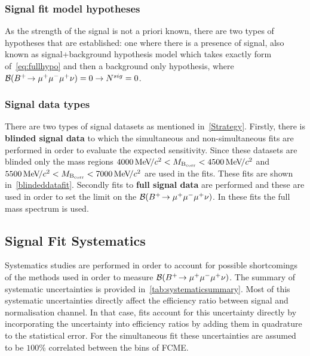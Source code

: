\subsubsection{Signal fit model hypotheses}
As the strength of the signal is not a priori known, there are two types of hypotheses that are established: one where there is a presence of signal, also known as signal+background hypothesis model which takes exactly form of~\autoref{eq:fullhypo} and then a background only hypothesis, where $\mathcal{B}({{{B}^+}}\!\rightarrow {\ensuremath{\mu^+\mu^-\mu^+}}\nu)=0 \rightarrow N^{sig}=0$.

\subsubsection{Signal data types}

There are two types of signal datasets as mentioned in~\autoref{Strategy}. Firstly, there is \textbf{blinded signal data} to which the simultaneous and non-simultaneous fits are performed in order to evaluate the expected sensitivity. Since these datasets are blinded only the mass regions $4000{{\mathrm{\,Me\kern -0.1em V\!/}c^2}}<M_{\rm{B_{corr}}}<{4500{\mathrm{\,Me\kern -0.1em V\!/}c^2}}$ and $5500{{\mathrm{\,Me\kern -0.1em V\!/}c^2}}<M_{\rm{B_{corr}}}<{7000{\mathrm{\,Me\kern -0.1em V\!/}c^2}}$ are used in the fits. These fits are shown in~\autoref{blindeddatafit}. Secondly fits to \textbf{full signal data} are performed and these are used in order to set the limit on the $\mathcal{B}({{{B}^+}}\!\rightarrow {\ensuremath{\mu^+\mu^-\mu^+}}\nu)$. In these fits the full mass spectrum is used.

\subsection{Signal Fit Systematics}
\label{systematics}
Systematics studies are performed in order to account for possible shortcomings of the methods used in order to measure $\mathcal{B}({{{B}^+}}\!\rightarrow {\ensuremath{\mu^+\mu^-\mu^+}}\nu)$. The summary of systematic uncertainties is provided in~\autoref{tab:systematicsummary}. Most of this systematic uncertainties directly affect the efficiency ratio between signal and normalisation channel. In that case, fits account for this uncertainty directly by incorporating the uncertainty into efficiency ratios by adding them in quadrature to the statistical error. For the simultaneous fit these uncertainties are assumed to be $100\%$ correlated between the bins of FCME.


